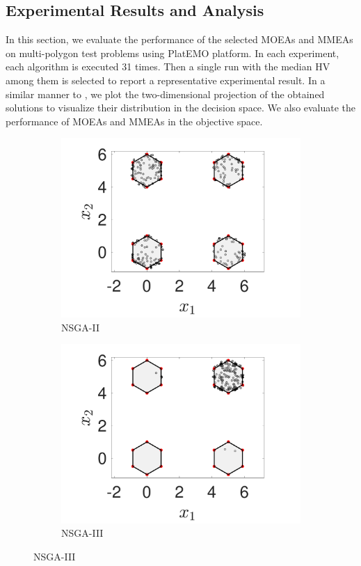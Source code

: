 \documentclass[conference]{IEEEtran}
\begin{document}
\subsection{Experimental Results and Analysis}
\label{Experimental Results}
In this section, we evaluate the performance of the selected MOEAs and MMEAs on multi-polygon test problems using PlatEMO platform\cite{tian2017platemo}. In each experiment, each algorithm is executed 31 times. Then a single run with the median HV among them is selected to report a representative experimental result. In a similar manner to \cite{ishibuchi2019salable}, we plot the two-dimensional projection of the obtained solutions to visualize their distribution in the decision space. We also evaluate the performance of MOEAs and MMEAs in the objective space.
\begin{figure}[htbp]
    \centering
    \begin{subfigure}[b]{.24\textwidth}
    \includegraphics[width=\linewidth]{Section5/dim2/PS/NSGAII}
    \caption{NSGA-II}
    \end{subfigure}
    \begin{subfigure}[b]{.24\textwidth}
    \includegraphics[width=\linewidth]{Section5/dim2/PS/NSGAIII}
    \caption{NSGA-III}
    \end{subfigure}
    

\end{figure}
\end{document}
